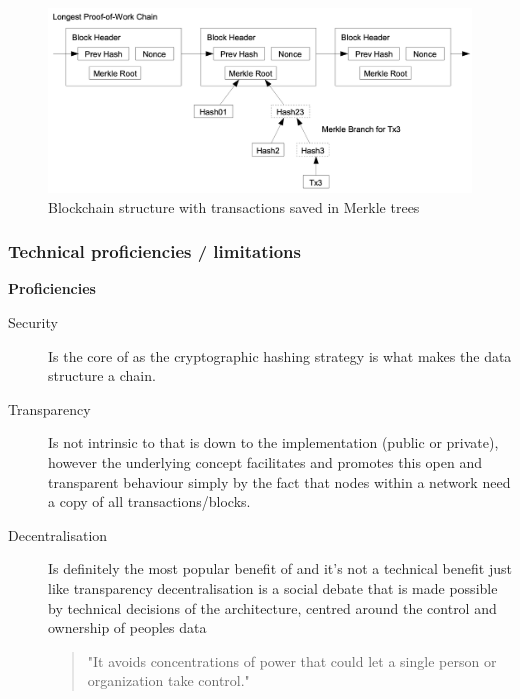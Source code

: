 \begin{figure}[H]
\caption{Blockchain structure with transactions saved in Merkle trees\cite{btc-white}}
\centering
\includegraphics[width=\textwidth,height=0.4\textheight,keepaspectratio]{images/patterns/merkle}
\centering
\end{figure}

\subsubsection{Technical proficiencies / limitations}

{\noindent\regular\textbf{Proficiencies}\vspace{2mm}}

\begin{description}
	\item[Security] Is the core of  as the cryptographic hashing strategy is what makes the data structure a chain.
	\item[Transparency] Is not intrinsic to  that is down to the implementation (public or private), however the underlying concept facilitates and promotes this open and transparent behaviour simply by the fact that nodes within a  network need a copy of all transactions/blocks.
	\item[Decentralisation] Is definitely the most popular benefit of  and it's not a technical benefit just like transparency decentralisation is a social debate that is made possible by technical decisions of the  architecture, centred around the control and ownership of peoples data \begin{quote}"It avoids concentrations of power that could let a single person or organization take control."\cite{bohme2015bitcoin}\end{quote} 
\end{description}

